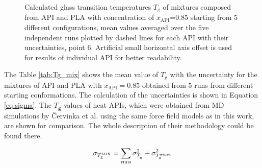 \begin{figure}[htb!]
	\centering
	\vspace{-0.2cm}
	\caption{Calculated glass transition temperatures $T_\text{g}$ of mixtures composed from API and PLA with concentration of $x_\text{API}$=0.85 starting from 5 different configurations, mean values averaged over the five independent runs plotted by dashed lines for each API with their uncertainties, point 6. Artificial small horizontal axis offset is used for results of individual API for better readability.}
	\label{fig:results_tg}    
	\vspace{-0.2cm}
\end{figure}  


The Table \ref{tab:Tg_mix} shows the mean value of $T_\text{g}$ with the uncertainty for the mixtures of API and PLA with $x_\text{API}=0.85$ obtained from 5 runs from different starting conformations. The calculation of the uncertainties is shown in Equation \ref{eq:sigma}. The $T_\textbf{g}$ values of neat APIs, which were obtained from MD simulations by Červinka et al. \cite{cervinka_structure_2021} using the same force field models as in this work, are shown for comparison. The whole description of their methodology could be found there. \vspace{-0.8cm}

\begin{equation}\label{eq:sigma}
	\vspace{-0.2cm}
	\sigma_{T_{\text{g}}^\text{MIX}} = \sum_\text{runs} \sigma_{T_{\text{g}}^\text{}}^2 + \sigma_{T_{\text{g}}^\text{worst}}^2
	\vspace{-0.4cm}
\end{equation}

